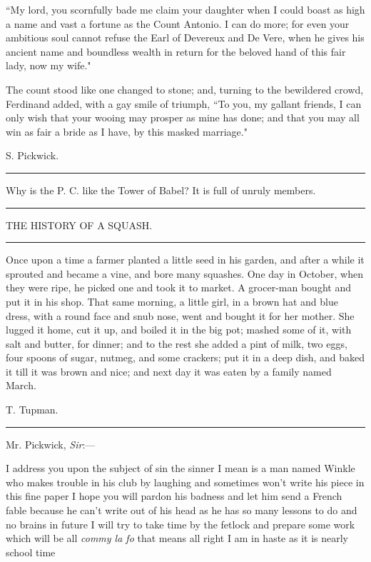 ``My lord, you scornfully bade me claim your daughter when I could boast
as high a name and vast a fortune as the Count Antonio. I can do more;
for even your ambitious soul cannot refuse the Earl of Devereux and De
Vere, when he gives his ancient name and boundless wealth in return for
the beloved hand of this fair lady, now my wife."

The count stood like one changed to stone; and, turning to the
bewildered crowd, Ferdinand added, with a gay smile of triumph, ``To you,
my gallant friends, I can only wish that your wooing may prosper as mine
has done; and that you may all win as fair a bride as I have, by this
masked marriage."

S. Pickwick.

\begin{center}\rule{0.5\linewidth}{0.5pt}\end{center}

Why is the P. C. like the Tower of Babel? It is full of unruly members.

\begin{center}\rule{0.5\linewidth}{0.5pt}\end{center}

THE HISTORY OF A SQUASH.

\begin{center}\rule{0.5\linewidth}{0.5pt}\end{center}

Once upon a time a farmer planted a little seed in his garden, and after
a while it sprouted and became a vine, and bore many squashes. One day
in October, when they were ripe, he picked one and took it to market. A
grocer-man bought and put it in his shop. That same morning, a little
girl, in a brown hat and blue dress, with a round face and snub nose,
went and bought it for her mother. She lugged it home, cut it up, and
boiled it in the big pot; mashed some of it, with salt and butter, for
dinner; and to the rest she added a pint of milk, two eggs, four spoons
of sugar, nutmeg, and some crackers; put it in a deep dish, and baked it
till it was brown and nice; and next day it was eaten by a family named
March.

{T. Tupman.}

\begin{center}\rule{0.5\linewidth}{0.5pt}\end{center}

{Mr. Pickwick}, \emph{Sir}:---

I address you upon the subject of sin the sinner I mean is a man named
Winkle who makes trouble in his club by laughing and sometimes
won't write his piece in this fine paper I hope you will
pardon his badness and let him send a French fable because he
can't write out of his head as he has so many lessons to
do and no brains in future I will try to take time by the fetlock and
prepare some work which will be all \emph{commy la fo} that means all
right I am in haste as it is nearly school time

